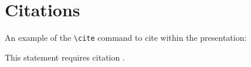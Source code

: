 \section{Citations}
\label{section3}

An example of the \texttt{\textbackslash cite} command to cite within the presentation:

This statement requires citation \cite{Smith:2012qr}.

\clearpage